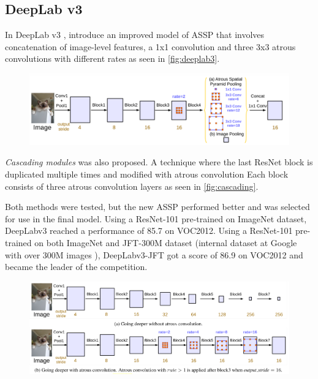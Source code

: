 \subsection{DeepLab v3}
In DeepLab v3 ,\citet{Chen2017a} introduce an improved model of ASSP that involves concatenation of image-level features, a 1x1 convolution and three 3x3 atrous convolutions with different rates as seen in \autoref{fig:deeplab3}.

\begin{figure}[H]
    \centering
    \includegraphics[width=0.8\linewidth]{fig/deeplab3.png}
    \label{fig:deeplab3}
\end{figure}

\emph{Cascading modules} was also proposed. A technique where the last ResNet block is duplicated multiple times and modified with atrous convolution Each block consists of three atrous convolution layers as seen in \autoref{fig:cascading}.

Both methods were tested, but the new ASSP performed better and was selected for use in the final model. Using a ResNet-101 pre-trained on ImageNet dataset, DeepLabv3 reached a performance of 85.7 on VOC2012. Using a ResNet-101 pre-trained on both ImageNet and JFT-300M dataset (internal dataset at Google with over 300M images \cite{Hinton2015}\cite{Sun2017}), DeepLabv3-JFT got a score of 86.9 on VOC2012 and became the leader of the competition.

\begin{figure}[H]
    \centering
    \includegraphics[width=0.8\linewidth]{fig/cascading.png}
    \label{fig:cascading}
\end{figure}



